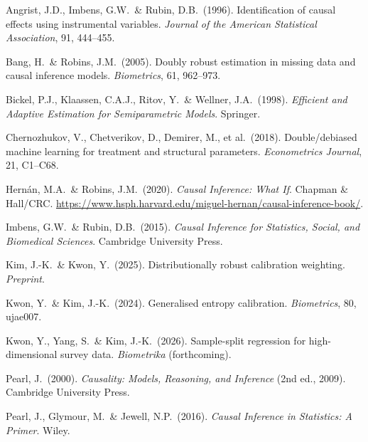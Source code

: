 \documentclass[12pt]{article}
\begin{document}
\begingroup
\small
\begin{description}[leftmargin=1.8em, labelindent=0pt, itemsep=3pt]
  \item Angrist, J.D., Imbens, G.W.\ \& Rubin, D.B.\ (1996).
    Identification of causal effects using instrumental variables.
    \textit{Journal of the American Statistical Association}, 91, 444--455.

  \item Bang, H.\ \& Robins, J.M.\ (2005).
    Doubly robust estimation in missing data and causal inference models.
    \textit{Biometrics}, 61, 962--973.

  \item Bickel, P.J., Klaassen, C.A.J., Ritov, Y.\ \& Wellner, J.A.\
    (1998).
    \textit{Efficient and Adaptive Estimation for Semiparametric Models}.
    Springer.

  \item Chernozhukov, V., Chetverikov, D., Demirer, M., et al.\ (2018).
    Double/debiased machine learning for treatment and structural
    parameters. \textit{Econometrics Journal}, 21, C1--C68.

  \item Hern\'an, M.A.\ \& Robins, J.M.\ (2020).
    \textit{Causal Inference: What If}.
    Chapman \& Hall/CRC.
    \url{https://www.hsph.harvard.edu/miguel-hernan/causal-inference-book/}.

  \item Imbens, G.W.\ \& Rubin, D.B.\ (2015).
    \textit{Causal Inference for Statistics, Social, and Biomedical
    Sciences}.
    Cambridge University Press.

  \item Kim, J.-K.\ \& Kwon, Y.\ (2025).
    Distributionally robust calibration weighting.
    \textit{Preprint}.

  \item Kwon, Y.\ \& Kim, J.-K.\ (2024).
    Generalised entropy calibration.
    \textit{Biometrics}, 80, ujae007.

  \item Kwon, Y., Yang, S.\ \& Kim, J.-K.\ (2026).
    Sample-split regression for high-dimensional survey data.
    \textit{Biometrika} (forthcoming).

  \item Pearl, J.\ (2000).
    \textit{Causality: Models, Reasoning, and Inference}
    (2nd ed., 2009). Cambridge University Press.

  \item Pearl, J., Glymour, M.\ \& Jewell, N.P.\ (2016).
    \textit{Causal Inference in Statistics: A Primer}. Wiley.


\end{description}
\end{document}
